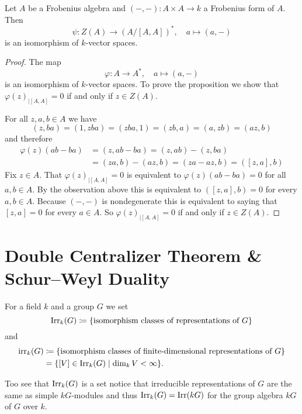 \begin{proposition}
  Let $A$ be a Frobenius algebra and $(-,-) \colon A \times A \to k$ a Frobenius form of $A$. Then
  \[
            \psi
    \colon  Z(A)
    \to     (A/[A,A])^*,
    \quad   a
    \mapsto (a,-)
  \]
  is an isomorphism of $k$-vector spaces.
\end{proposition}
\begin{proof}
  The map
  \[
            \varphi
    \colon  A
    \to     A^*,
    \quad   a
    \mapsto (a, -)
  \]
  is an isomorphism of $k$-vector spaces.
  To prove the proposition we show that $\varphi(z)_{|[A,A]} = 0$ if and only if $z \in Z(A)$.
  
  For all $z, a, b \in A$ we have
  \[
      (z,ba)
    = (1,zba)
    = (zba,1)
    = (zb,a)
    = (a,zb)
    = (az,b)
  \]
  and therefore
  \begin{align*}
        \varphi(z)(ab-ba)
    &=  (z,ab-ba)
     =  (z,ab) - (z,ba) \\
    &=  (za,b) - (az,b)
     =  (za-az,b)
     =  ([z,a],b)
  \end{align*}
  Fix $z \in A$.
  That $\varphi(z)_{|[A,A]} = 0$ is equivalent to $\varphi(z)(ab-ba) = 0$ for all $a,b \in A$.
  By the observation above this is equivalent to $([z,a],b) = 0$ for every $a,b \in A$.
  Because $(-,-)$ is nondegenerate this is equivalent to saying that $[z,a] = 0$ for every $a \in A$.
  So $\varphi(z)_{|[A,A]} = 0$ if and only if $z \in Z(A)$.
\end{proof}





\section{Double Centralizer Theorem \& Schur--Weyl Duality}


\begin{definition}
  For a field $k$ and a group $G$ we set
  \[
              \operatorname{Irr}_k(G)
    \coloneqq \{ \text{isomorphism classes of representations of $G$} \}
  \]
  and
  \begin{align*}
                \operatorname{irr}_k(G)
    &\coloneqq  \{ \text{isomorphism classes of finite-dimensional representations of $G$} \} \\
    &=          \{ [V] \in \operatorname{Irr}_k(G) \mid \dim_k V < \infty \}.
  \end{align*}
\end{definition}


Too see that $\operatorname{Irr}_k(G)$ is a set notice that irreducible representations of $G$ are the same as simple $kG$-modules and thus $\operatorname{Irr}_k(G) = \operatorname{Irr}(kG)$ for the group algebra $kG$ of $G$ over $k$.


